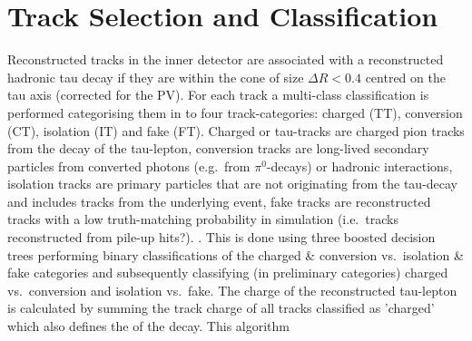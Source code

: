 \section{Track Selection and Classification}
\label{sec:reco_track_sel_classif}
%
Reconstructed tracks in the inner detector are associated with a reconstructed
hadronic tau decay if they are within the cone of size $\Delta R < 0.4$ centred
on the tau axis (corrected for the PV).
%
%
%
For each track a multi-class classification is performed categorising them in to
four track-categories: charged (TT), conversion (CT), isolation (IT) and fake
(FT). Charged or tau-tracks are charged pion tracks from the decay of the
tau-lepton, conversion tracks are long-lived secondary particles from converted
photons (e.g.\ from $\pi^0$-decays) or hadronic interactions, isolation tracks
are primary particles that are not originating from the tau-decay and includes
tracks from the underlying event, fake tracks are reconstructed tracks with a
low truth-matching probability in simulation (i.e.\ tracks reconstructed from
pile-up hits?). . This is done using three boosted
decision trees performing binary classifications of the charged \& conversion
vs.\ isolation \& fake categories and subsequently classifying (in preliminary
categories) charged vs.\ conversion and isolation vs.\ fake.  The charge of the reconstructed
tau-lepton is calculated by summing the track charge of all tracks classified as
'charged' which also defines the  of the decay. This algorithm
